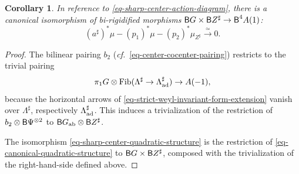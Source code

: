 \documentclass[10pt,english,reqno]{amsart}
\newcommand{\Fib}{\mathrm{Fib}}
\newcommand{\deloop}{\textnormal{\textsf{B}}}
\newcommand{\adjoint}{\textnormal{ad}}
\newcommand{\abelian}{\textnormal{ab}}
\newtheorem{cor}[subsubsection]{Corollary}
\theoremstyle{definition}
\numberwithin{equation}{section}
\begin{document}

\begin{cor}
\label{cor-sharp-center-quadratic-structure}
In reference to \eqref{eq-sharp-center-action-diagram}, there is a canonical isomorphism of bi-rigidified morphisms $\deloop G \times \deloop Z^{\sharp} \rightarrow \deloop^4A(1)$:
\begin{equation}
\label{eq-sharp-center-quadratic-structure}
(a^{\sharp})^*\mu - (p_1)^*\mu - (p_2)^*\mu_{Z^{\sharp}} \xrightarrow{\simeq} 0.
\end{equation}
\end{cor}
\begin{proof}
The bilinear pairing $b_2$ (\emph{cf.}~\eqref{eq-center-cocenter-pairing}) restricts to the trivial pairing
$$
\pi_1 G \otimes \Fib(\Lambda^{\sharp} \rightarrow \Lambda^{\sharp}_{\adjoint}) \rightarrow A(-1),
$$
because the horizontal arrows of \eqref{eq-strict-weyl-invariant-form-extension} vanish over $\Lambda^{\sharp}$, respectively $\Lambda^{\sharp}_{\adjoint}$. This induces a trivialization of the restriction of $b_2\otimes \deloop\Psi^{\otimes 2}$ to $\deloop G_{\abelian} \otimes \deloop Z^{\sharp}$.

The isomorphism \eqref{eq-sharp-center-quadratic-structure} is the restriction of \eqref{eq-canonical-quadratic-structure} to $\deloop G \times \deloop Z^{\sharp}$, composed with the trivialization of the right-hand-side defined above.
\end{proof}

\end{document}
